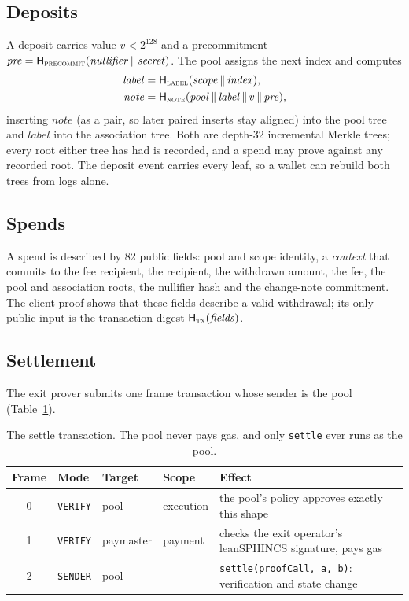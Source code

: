 \documentclass[11pt,a4paper]{article}
\newcommand{\code}[1]{\texttt{\small #1}}
\newcommand{\Hf}{\mathsf{H}}
\begin{document}
\subsection{Deposits}
A deposit carries value $v < 2^{128}$ and a precommitment
$\mathit{pre} = \Hf_{\textsc{precommit}}(\mathit{nullifier} \,\|\, \mathit{secret})$. The pool assigns the
next index and computes
\begin{align*}
  \mathit{label} &= \Hf_{\textsc{label}}(\mathit{scope} \,\|\, \mathit{index}), \\
  \mathit{note}  &= \Hf_{\textsc{note}}(\mathit{pool} \,\|\, \mathit{label} \,\|\, v \,\|\, \mathit{pre}),
\end{align*}
inserting $\mathit{note}$ (as a pair, so later paired inserts stay aligned) into the pool tree and
$\mathit{label}$ into the association tree. Both are depth-32 incremental Merkle trees; every root either
tree has had is recorded, and a spend may prove against any recorded root. The deposit event carries
every leaf, so a wallet can rebuild both trees from logs alone.

\subsection{Spends}
A spend is described by 82 public fields: pool and scope identity, a \emph{context} that commits to the
fee recipient, the recipient, the withdrawn amount, the fee, the pool and association roots, the
nullifier hash and the change-note commitment. The client proof shows that these fields describe a valid
withdrawal; its only public input is the transaction digest $\Hf_{\textsc{tx}}(\mathit{fields})$.

\subsection{Settlement}
The exit prover submits one frame transaction whose sender is the pool (Table~\ref{tab:settle}).

\begin{table}[ht]
\centering\small
\begin{tabularx}{\linewidth}{@{}clllX@{}}
\toprule
Frame & Mode & Target & Scope & Effect \\
\midrule
0 & \code{VERIFY} & pool & execution & the pool's policy approves exactly this shape \\
1 & \code{VERIFY} & paymaster & payment & checks the exit operator's leanSPHINCS signature, pays gas \\
2 & \code{SENDER} & pool & & \code{settle(proofCall, a, b)}: verification and state change \\
\bottomrule
\end{tabularx}
\caption{The settle transaction. The pool never pays gas, and only \code{settle} ever runs as the pool.}
\label{tab:settle}
\end{table}
\end{document}
